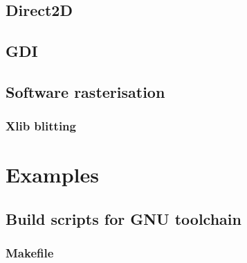 \documentclass{article}
\begin{document}
\subsection{Direct2D}
\label{subsec:direct2d}


\subsection{GDI}
\label{subsec:windows-gdi}


\subsection{Software rasterisation}
\label{subsec:software-rasterisation}


\subsubsection{Xlib blitting}
\label{subsubsection:xlib-blitting}


\pagebreak
\section{Examples}
\label{sec:examples}

\subsection{Build scripts for GNU toolchain}
\label{subsec:build-scripts-gnu}

\subsubsection{Makefile}
\label{subsubsec:makefile}
\end{document}
